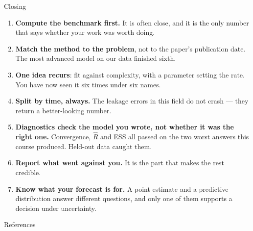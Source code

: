\documentclass[aspectratio=169, 11pt]{beamer}
\begin{document}
\begin{frame}{Closing}
  \begin{keybox}
    {\footnotesize
    \begin{enumerate}\itemsep2pt
      \item \textbf{Compute the benchmark first.} It is often close, and it is the only number
            that says whether your work was worth doing.

      \item \textbf{Match the method to the problem}, not to the paper's publication date. The
            most advanced model on our data finished sixth.

      \item \textbf{One idea recurs}: fit against complexity, with a parameter setting the rate.
            You have now seen it six times under six names.

      \item \textbf{Split by time, always.} The leakage errors in this field do not crash --- they
            return a better-looking number.

      \item \textbf{Diagnostics check the model you wrote, not whether it was the right one.}
            Convergence, $\hat{R}$ and ESS all passed on the two worst answers this course
            produced. Held-out data caught them.

      \item \textbf{Report what went against you.} It is the part that makes the rest credible.

      \item \textbf{Know what your forecast is for.} A point estimate and a predictive
            distribution answer different questions, and only one of them supports a decision
            under uncertainty.
    \end{enumerate}
    }
  \end{keybox}

  \vspace{0.05cm}
\end{frame}

\begin{frame}[allowframebreaks]{References}
  \printbibliography[heading=none]
\end{frame}
\end{document}
